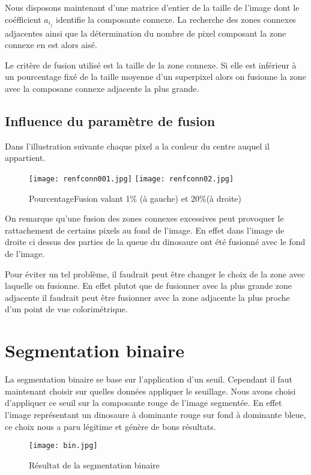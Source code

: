 \documentclass{article}
\begin{document}
Nous disposons maintenant d'une matrice d'entier de la taille de l'image dont le coéfficient $a_i_j$ identifie la composante connexe. La recherche des zones connexes adjacentes ainsi que la détermination du nombre de pixel composant la zone connexe en est alors aisé.

Le critère de fusion utilisé est la taille de la zone connexe. Si elle est inférieur à un pourcentage fixé de la taille moyenne d'un superpixel alors on fusionne la zone avec la composane connexe adjacente la plus grande.

\subsection{Influence du paramètre de fusion}

Dans l'illustration suivante chaque pixel a la couleur du centre auquel il appartient.

\begin{figure}[H]
\centering
\texttt{[image: renfconn001.jpg]}
\texttt{[image: renfconn02.jpg]}
\caption{PourcentageFusion valant 1\% (à gauche) et 20\%(à droite)}
\end{figure}

On remarque qu'une fusion des zones connexes excessives peut provoquer le rattachement de certains pixels au fond de l'image. En effet dans l'image de droite ci dessus des parties de la queue du dinosaure ont été fusionné avec le fond de l'image.

Pour éviter un tel problème, il faudrait peut être changer le choix de la zone avec laquelle on fusionne. En effet plutot que de fusionner avec la plus grande zone adjacente il faudrait peut être fusionner avec la zone adjacente la plus proche d'un point de vue colorimétrique.

\section{Segmentation binaire}

La segmentation binaire se base sur l'application d'un seuil. Cependant il faut maintenant choisir sur quelles données appliquer le seuillage. Nous avons choisi d'appliquer ce seuil sur la composante rouge de l'image segmentée. En effet l'image représentant un dinosaure à dominante rouge sur fond à dominante bleue, ce choix nous a paru légitime et génère de bons résultats.

\begin{figure}[H]
\centering
\texttt{[image: bin.jpg]}
\caption{Résultat de la segmentation binaire}
\end{figure}
\end{document}
